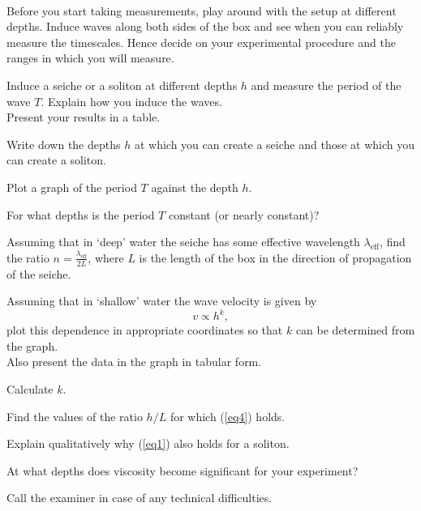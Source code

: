 \documentclass[../TST.tex]{subfiles}
\begin{document}
\begin{eproblem}[Seiche]{\ \\[5pt]}
Before you start taking measurements, play around with the setup at different depths. Induce waves along both sides of the box and see when you can reliably measure the timescales. Hence decide on your experimental procedure and the ranges in which you will measure.
\begin{subpart}
	\item Induce a seiche or a soliton at different depths $h$ and measure the period of the wave $T$. Explain how you induce the waves. \\[5pt]
Present your results in a table. 
	\item Write down the depths $h$ at which you can create a seiche and those at which you can create a soliton. 
	\item Plot a graph of the period $T$ against the depth $h$.
	\item For what depths is the period $T$ constant (or nearly constant)? 
	\item Assuming that in `deep' water the seiche has some effective wavelength $\lambda_\mathrm{eff}$, find the ratio $n=\frac{\lambda_\mathrm{eff}}{2L}$, where $L$ is the length of the box in the direction of propagation of the seiche. 
	\item Assuming that in `shallow' water the wave velocity is given by 
\begin{equation}
v\propto h^k
,
\label{eq4}
\end{equation}
plot this dependence in appropriate coordinates so that $k$ can be determined from the graph. \\[5pt]
Also present the data in the graph in tabular form. 
\item Calculate $k$.
\item Find the values of the ratio $h/L$ for which  (\ref{eq4}) holds.
\item Explain qualitatively why  (\ref{eq1}) also holds for a soliton.
\item At what depths does viscosity become significant for your experiment? 
\end{subpart}
Call the examiner in case of any technical difficulties. 
\end{eproblem}
\end{document}
